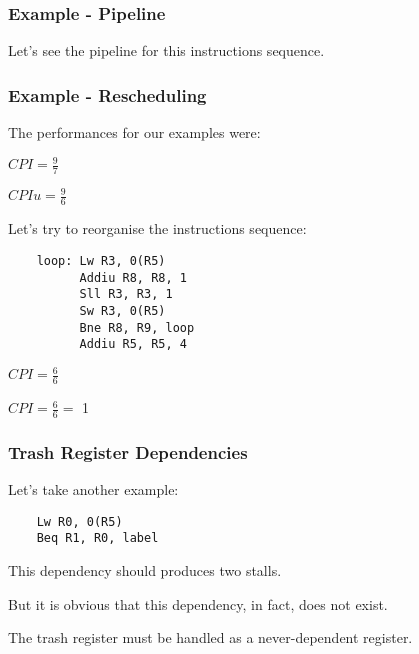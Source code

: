 
\begin{frame}
  \frametitle{Example - Pipeline}

  Let's see the pipeline for this instructions sequence.

  \begin{center}
  \end{center}
\end{frame}


\begin{frame}[containsverbatim]
  \frametitle{Example - Rescheduling}

  The performances for our examples were:

  \-

  $CPI = \frac{9}{7}$

  $CPIu = \frac{9}{6}$

  \-

  Let's try to reorganise the instructions sequence:

  \begin{verbatim}
    loop: Lw R3, 0(R5)
          Addiu R8, R8, 1
          Sll R3, R3, 1
          Sw R3, 0(R5)
          Bne R8, R9, loop
          Addiu R5, R5, 4
  \end{verbatim}

  \-

  $CPI = \frac{6}{6}$

  $CPI = \frac{6}{6} = $ \alert{1}
\end{frame}


\begin{frame}[containsverbatim]
  \frametitle{Trash Register Dependencies}

  Let's take another example:

  \begin{verbatim}
    Lw R0, 0(R5)
    Beq R1, R0, label
  \end{verbatim}

  This dependency should produces two stalls.

  \-

  But it is obvious that this dependency, in fact, does not exist.

  \-

  The trash register must be handled as a never-dependent register.
\end{frame}



